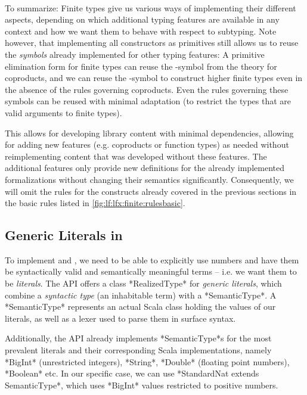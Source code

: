 \paragraph{} To summarize: Finite types give us various ways of implementing their different aspects, depending on which additional typing features are available in any context and how we want them to behave with respect to subtyping. Note however, that implementing all constructors as primitives still allows us to reuse the \emph{symbols} already implemented for other typing features: A primitive elimination form for finite types can reuse the \cmatchsym-symbol from the  theory for coproducts, and we can reuse the \coprodsym-symbol to construct higher finite types even in the absence of the rules governing coproducts. Even the rules governing these symbols can be reused with minimal adaptation (to restrict the types that are valid arguments to finite types).

This allows for developing library content with minimal dependencies, allowing for adding new features (e.g. coproducts or function types) as needed without reimplementing content that was developed without these features. The additional features only provide new definitions for the already implemented formalizations without changing their semantics significantly. Consequently, we will omit the rules for the constructs already covered in the previous sections in the basic rules listed in \autoref{fig:lf:lfx:finite:rulesbasic}.

\subsection{Generic Literals in \mmt}\label{sec:lf:lfx:literals}

To implement \enumsym and \enumusym, we need to be able to explicitly use numbers and have them be syntactically valid and semantically meaningful \mmt terms -- i.e. we want them to be \emph{literals}. The \mmt API offers a class *RealizedType* for \emph{generic literals}, which combine a \emph{syntactic type} (an inhabitable \mmt term) with a *SemanticType*. A *SemanticType* represents an actual Scala class holding the values of our literals, as well as a lexer used to parse them in surface syntax.

Additionally, the \mmt API already implements *SemanticType*s for the most prevalent literals and their corresponding Scala implementations, namely *BigInt* (unrestricted integers), *String*, *Double* (floating point numbers), *Boolean* etc. In our specific case, we can use *StandardNat extends SemanticType*, which uses *BigInt* values restricted to positive numbers.

